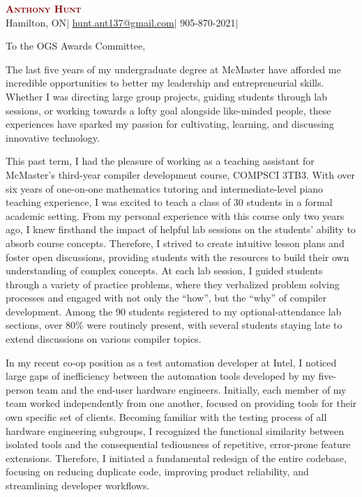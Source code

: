 \documentclass[11pt]{letter}
\makeatletter
\newcommand{\fullName}{Anthony Hunt}
\newcommand{\accentColour}{Maroon}
\newcommand{\currentCity}{Hamilton, ON}
\newcommand{\email}{\href{mailto:hunt.ant137@gmail.com}{\underline{hunt.ant137@gmail.com}}}
\newcommand{\phone}{905-870-2021}
\newcommand{\githubUrl}[1]{%
   \href{#1}{\faGithubSquare}%
  }
\newcommand{\linkedinUrl}[1]{%
   \href{#1}{\faLinkedin}%
  }
\makeatother
\begin{document}
\begin{center}
    \textcolor{\accentColour}{\textbf{\Huge \scshape \fullName}} \\ \vspace{1pt}
    \small \currentCity $|$ \email $|$ \phone $|$
    \linkedinUrl{https://linkedin.com/in/anthonyhunt137}
    \githubUrl{https://github.com/Ant13731}
\end{center}

\setlength\parindent{0pt}
To the OGS Awards Committee,
\setlength\parindent{24pt}

The last five years of my undergraduate degree at McMaster have afforded me incredible opportunities to better my leadership and entrepreneurial skills. Whether I was directing large group projects, guiding students through lab sessions, or working towards a lofty goal alongside like-minded people, these experiences have sparked my passion for cultivating, learning, and discussing innovative technology.

This past term, I had the pleasure of working as a teaching assistant for McMaster's third-year compiler development course, COMPSCI 3TB3. With over six years of one-on-one mathematics tutoring and intermediate-level piano teaching experience, I was excited to teach a class of 30 students in a formal academic setting. From my personal experience with this course only two years ago, I knew firsthand the impact of helpful lab sessions on the students' ability to absorb course concepts. Therefore, I strived to create intuitive lesson plans and foster open discussions, providing students with the resources to build their own understanding of complex concepts. At each lab session, I guided students through a variety of practice problems, where they verbalized problem solving processes and engaged with not only the “how”, but the “why” of compiler development. Among the 90 students registered to my optional-attendance lab sections, over 80\% were routinely present, with several students staying late to extend discussions on various compiler topics.

In my recent co-op position as a test automation developer at Intel, I noticed large gaps of inefficiency between the automation tools developed by my five-person team and the end-user hardware engineers. Initially, each member of my team worked independently from one another, focused on providing tools for their own specific set of clients. Becoming familiar with the testing process of all hardware engineering subgroups, I recognized the functional similarity between isolated tools and the consequential tediousness of repetitive, error-prone feature extensions. Therefore, I initiated a fundamental redesign of the entire codebase, focusing on reducing duplicate code, improving product reliability, and streamlining developer workflows.
\end{document}
